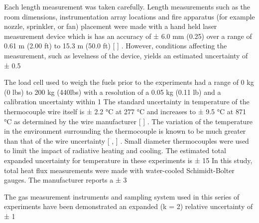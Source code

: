 \documentclass[12pt,oneside]{book}
\begin{document}
Each length measurement was taken carefully. Length measurements such as the room dimensions, instrumentation array locations and fire apparatus (for example nozzle, sprinkler, or fan) placement were made with a hand held laser measurement device which is has an accuracy of ± 6.0 mm (0.25) over a range of 0.61 m (2.00 ft) to 15.3 m (50.0 ft) [ ] .  However, conditions affecting the measurement, such as levelness of the device, yields an estimated uncertainty of ± 0.5 %

The load cell used to weigh the fuels prior to the experiments had a range of 0 kg (0 lbs) to 200 kg (440lbs) with a resolution of a 0.05 kg (0.11 lb) and a calibration uncertainty within 1%
The standard uncertainty in temperature of the thermocouple wire itself is  ± 2.2 °C at 277 °C and increases to ± 9.5 °C at 871 °C as determined by the wire manufacturer [ ] .  The variation of the temperature in the environment surrounding the thermocouple is known to be much greater than that of the wire uncertainty [ ,  ] .  Small diameter thermocouples were used to limit the impact of radiative heating and cooling.  The estimated total expanded uncertainty for temperature in these experiments is ± 15 %
In this study, total heat flux measurements were made with water-cooled Schimidt-Bolter gauges.  The manufacturer reports a ± 3 %

The gas measurement instruments and sampling system used in this series of experiments have been demonstrated an expanded (k = 2) relative uncertainty of ± 1 %
\end{document}

